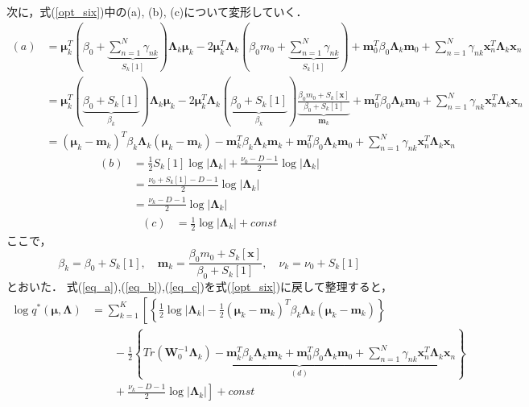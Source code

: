 \documentclass[uplatex]{jsarticle}
\begin{document}
次に，式(\ref{opt_six})中の(a), (b), (c)について変形していく．
\begin{align}
\label{eq_a}
(a) &= \bm{\mu}_k^T (\beta_0 + \underset{S_k[1]}{\underbrace{\sum_{n=1}^N \gamma_{nk}}}) \bm{\Lambda}_k \bm{\mu}_k - 2 \bm{\mu}_k^T\bm{\Lambda}_k(\beta_0m_0 + \underset{S_k[1]}{\underbrace{\sum_{n=1}^N \gamma_{nk}}}) 
 + \bm{m}_0^T\beta_0\bm{\Lambda}_k\bm{m}_0 + \sum_{n=1}^N\gamma_{nk}\bm{x}_n^T\bm{\Lambda}_k\bm{x}_n \nonumber \\
    &= \bm{\mu}_k^T (\underset{\beta_k}{\underbrace{\beta_0 + S_k[1]}})\bm{\Lambda}_k\bm{\mu}_k - 2\bm{\mu}_k^T\bm{\Lambda}_k(\underset{\beta_k}{\underbrace{\beta_0 + S_k[1]}})\underset{\bm{m}_k}{\underbrace{\frac{\beta_0m_0 + S_k[\bm{x}]}{\beta_0 + S_k[1]}}}
 + \bm{m}_0^T\beta_0\bm{\Lambda}_k\bm{m}_0 + \sum_{n=1}^N\gamma_{nk}\bm{x}_n^T\bm{\Lambda}_k\bm{x}_n \nonumber \\
    &= (\bm{\mu}_k - \bm{m}_k)^T\beta_k\bm{\Lambda}_k(\bm{\mu}_k - \bm{m}_k) - \bm{m}_k^T\beta_k\bm{\Lambda}_k\bm{m}_k + \bm{m}_0^T\beta_0\bm{\Lambda}_k\bm{m}_0 + \sum_{n=1}^N \gamma_{nk}\bm{x}_n^T\bm{\Lambda}_k\bm{x}_n
\end{align}
\begin{align}
\label{eq_b}
(b) &= \frac{1}{2}S_k[1]\log|\bm{\Lambda}_k| + \frac{\nu_0 - D - 1}{2}\log|\bm{\Lambda}_k| \nonumber \\
    &= \frac{\nu_0 + S_k[1] - D - 1}{2}\log|\bm{\Lambda}_k| \nonumber \\
    &= \frac{\nu_k - D - 1}{2}\log|\bm{\Lambda}_k|
\end{align}
\begin{align}
\label{eq_c}
(c) &= \frac{1}{2}\log|\bm{\Lambda}_k| + const
\end{align}
ここで，
\begin{equation}
\beta_k = \beta_0 + S_k[1], \quad \bm{m}_k = \frac{\beta_0m_0 + S_k[\bm{x}]}{\beta_0 + S_k[1]}, \quad \nu_k = \nu_0 + S_k[1] \nonumber
\end{equation}
とおいた．
式(\ref{eq_a}),(\ref{eq_b}),(\ref{eq_c})を式(\ref{opt_six})に戻して整理すると，
\begin{align}
\label{eq_ten}
\log q^* (\bm{\mu}, \bm{\Lambda}) &= \sum_{k=1}^K \left[ \left\{ \frac{1}{2}\log|\bm{\Lambda}_k| - \frac{1}{2}(\bm{\mu}_k-\bm{m}_k)^T\beta_k\bm{\Lambda}_k(\bm{\mu}_k-\bm{m}_k) \right\} \right. \nonumber \\
 &\qquad- \frac{1}{2} \left\{ \underbrace{Tr(\bm{W}_0^{-1}\bm{\Lambda}_k) - \bm{m}_k^T\beta_k\bm{\Lambda}_k\bm{m}_k + \bm{m}_0^T\beta_0\bm{\Lambda}_k\bm{m}_0 + \sum_{n=1}^N \gamma_{nk}\bm{x}_n^T\bm{\Lambda}_k\bm{x}_n}_{(d)} \right\} \nonumber \\
 &\qquad+ \left. \frac{\nu_k - D - 1}{2}\log|\bm{\Lambda}_k| \right] + const
\end{align}
\end{document}
